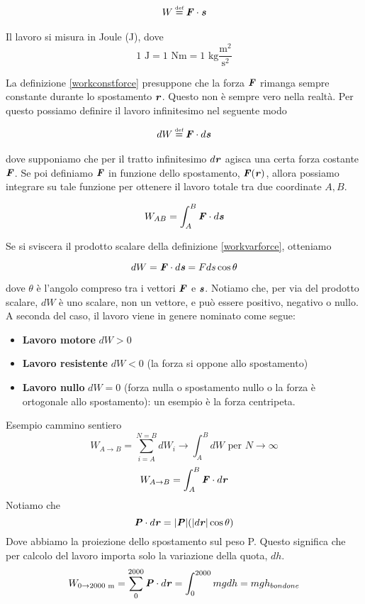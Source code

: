 \begin{align}
W \eqdef \vecsymb{F}\cdot\vecsymb{s}\label{workconstforce}
\end{align}

\noindent Il lavoro si misura in Joule (J), dove
\[ 1\text{ J} = 1\text{ Nm} = 1\text{ kg$\frac{\text{m}^2}{\text{s}^2}$} \]

La definizione \ref{workconstforce} presuppone che la forza $\textbf{\textit{F}}$
rimanga sempre constante durante lo spostamento $\textbf{\textit{r}}$. Questo non è
sempre vero nella realtà. Per questo possiamo definire il lavoro infinitesimo
nel seguente modo

\begin{align}
    dW \eqdef \vecsymb{F} \cdot d\vecsymb{s}\label{workvarforce}
\end{align}

\noindent dove supponiamo che per il tratto infinitesimo $d\textbf{\textit{r}}$ agisca
una certa forza costante $\textbf{\textit{F}}$. Se poi definiamo $\textbf{\textit{F}}$ in
funzione dello spostamento, $\textbf{\textit{F}}(\textbf{\textit{r}})$, allora possiamo integrare
su tale funzione per ottenere il lavoro totale tra due coordinate $A,B$.

\begin{align}
    W_{AB} = \int_{A}^{B}\textbf{\textit{F}}\cdot d\textbf{\textit{s}}
\end{align}

\noindent Se si sviscera il prodotto scalare della definizione \ref{workvarforce},
otteniamo

\[ dW = \textbf{\textit{F}}\cdot d\textbf{\textit{s}} = Fds\cos\theta \]

\noindent dove $\theta$ è l'angolo compreso tra i vettori $\textbf{\textit{F}}$
e $\textbf{\textit{s}}$. Notiamo che, per via del prodotto scalare, $dW$ è uno scalare, non un vettore, e
può essere positivo, negativo o nullo. A seconda del caso, il lavoro
viene in genere nominato come segue:

\begin{itemize}
    \item \textbf{Lavoro motore} $dW > 0$
    \item \textbf{Lavoro resistente} $dW < 0$ (la forza si oppone allo spostamento)
    \item \textbf{Lavoro nullo} $dW = 0$ (forza nulla o spostamento nullo o la forza è ortogonale allo spostamento): un
    esempio è la forza centripeta.
\end{itemize}


Esempio cammino sentiero
\[ W_{A\to B} = \sum_{i = A}^{N = B}dW_i \to \int_{A}^{B}dW \text{ per } N\to\infty \]
\[ W_{A\to B} = \int_{A}^{B}\textbf{\textit{F}}\cdot d\textbf{\textit{r}} \]
Notiamo che 
\[ \textbf{\textit{P}}\cdot d\textbf{\textit{r}} = |\textbf{\textit{P}}| (|d\textbf{\textit{r}}|\cos\theta) \]
Dove abbiamo la proiezione dello spostamento sul peso P. Questo significa che
per calcolo del lavoro importa solo la variazione della quota, $dh$.
\[ W_{0\to 2000\text{ m}} = \sum_{0}^{2000}\textbf{\textit{P}}\cdot d\textbf{\textit{r}} = \int_{0}^{2000}mg dh = mgh_{bondone} \]

